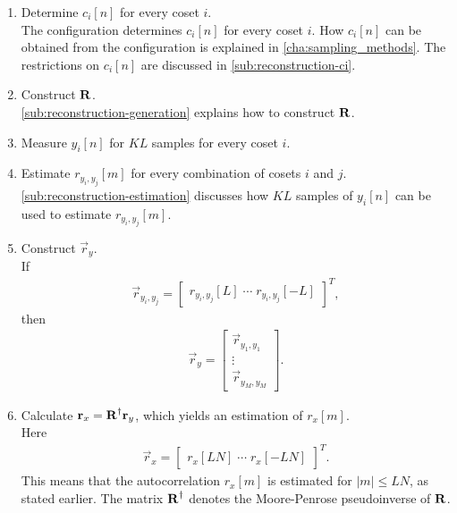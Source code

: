 \documentclass[a4paper, openany, oneside]{memoir}
\begin{document}
\begin{enumerate}[labelindent=0pt,labelwidth=\widthof{\ref{last-item1}},label=Step \arabic*:,itemindent=1em,leftmargin=!]
    \item Determine $c_i[n]$ for every coset $i$. \\
    The configuration determines $c_i[n]$ for every coset $i$. How $c_i[n]$ can be obtained from the configuration is explained in \cref{cha:sampling_methods}. The restrictions on $c_i[n]$ are discussed in \cref{sub:reconstruction-ci}.
    \item Construct $\boldsymbol{\mathbf{R}}$. \\
    \cref{sub:reconstruction-generation} explains how to construct $\boldsymbol{\mathbf{R}}$.
    \item Measure $y_i[n]$ for $KL$ samples for every coset $i$.
    \item Estimate $r_{y_i,y_j}[m]$ for every combination of cosets $i$ and $j$. \\
    \cref{sub:reconstruction-estimation} discusses how $KL$ samples of $y_i[n]$ can be used to estimate $r_{y_i,y_j}[m]$.
    \item Construct $\vec{r}_y$. \\
    If
    \begin{align*}
        \vec{r}_{y_i,y_j} = \begin{bmatrix}
            r_{y_i,y_j}[L] \; \cdots \; r_{y_i,y_j}[-L]
        \end{bmatrix}^T,
    \end{align*}
    then
    \begin{align*}
        \vec{r}_y = \begin{bmatrix}
            \vec{r}_{y_1,y_1} \\ \vdots \\ \vec{r}_{y_M,y_M}
        \end{bmatrix}.
    \end{align*}
    \item Calculate $\boldsymbol{\mathbf{r}}_x=\boldsymbol{\mathbf{R}}^\dagger \boldsymbol{\mathbf{r}}_y$, which yields an estimation of $r_x[m]$. \\
    Here
    \begin{align*}
         \vec{r}_x = \begin{bmatrix}
             r_x[LN] \; \cdots \; r_x[-LN]
         \end{bmatrix}^T.
    \end{align*} This means that the autocorrelation $r_x[m]$ is estimated for $|m| \le LN$, as stated earlier. The matrix $\boldsymbol{\mathbf{R}}^\dagger$ denotes the Moore-Penrose pseudoinverse of $\boldsymbol{\mathbf{R}}$.
    \label{last-item1}
\end{enumerate}
\end{document}
